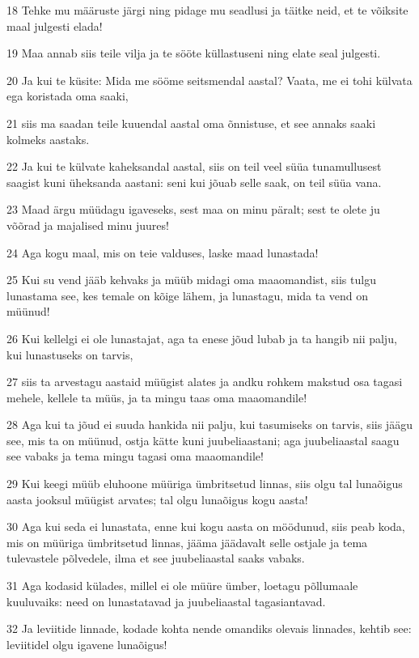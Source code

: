\par 18 Tehke mu määruste järgi ning pidage mu seadlusi ja täitke neid, et te võiksite maal julgesti elada!
\par 19 Maa annab siis teile vilja ja te sööte küllastuseni ning elate seal julgesti.
\par 20 Ja kui te küsite: Mida me sööme seitsmendal aastal? Vaata, me ei tohi külvata ega koristada oma saaki,
\par 21 siis ma saadan teile kuuendal aastal oma õnnistuse, et see annaks saaki kolmeks aastaks.
\par 22 Ja kui te külvate kaheksandal aastal, siis on teil veel süüa tunamullusest saagist kuni üheksanda aastani: seni kui jõuab selle saak, on teil süüa vana.
\par 23 Maad ärgu müüdagu igaveseks, sest maa on minu päralt; sest te olete ju võõrad ja majalised minu juures!
\par 24 Aga kogu maal, mis on teie valduses, laske maad lunastada!
\par 25 Kui su vend jääb kehvaks ja müüb midagi oma maaomandist, siis tulgu lunastama see, kes temale on kõige lähem, ja lunastagu, mida ta vend on müünud!
\par 26 Kui kellelgi ei ole lunastajat, aga ta enese jõud lubab ja ta hangib nii palju, kui lunastuseks on tarvis,
\par 27 siis ta arvestagu aastaid müügist alates ja andku rohkem makstud osa tagasi mehele, kellele ta müüs, ja ta mingu taas oma maaomandile!
\par 28 Aga kui ta jõud ei suuda hankida nii palju, kui tasumiseks on tarvis, siis jäägu see, mis ta on müünud, ostja kätte kuni juubeliaastani; aga juubeliaastal saagu see vabaks ja tema mingu tagasi oma maaomandile!
\par 29 Kui keegi müüb eluhoone müüriga ümbritsetud linnas, siis olgu tal lunaõigus aasta jooksul müügist arvates; tal olgu lunaõigus kogu aasta!
\par 30 Aga kui seda ei lunastata, enne kui kogu aasta on möödunud, siis peab koda, mis on müüriga ümbritsetud linnas, jääma jäädavalt selle ostjale ja tema tulevastele põlvedele, ilma et see juubeliaastal saaks vabaks.
\par 31 Aga kodasid külades, millel ei ole müüre ümber, loetagu põllumaale kuuluvaiks: need on lunastatavad ja juubeliaastal tagasiantavad.
\par 32 Ja leviitide linnade, kodade kohta nende omandiks olevais linnades, kehtib see: leviitidel olgu igavene lunaõigus!
